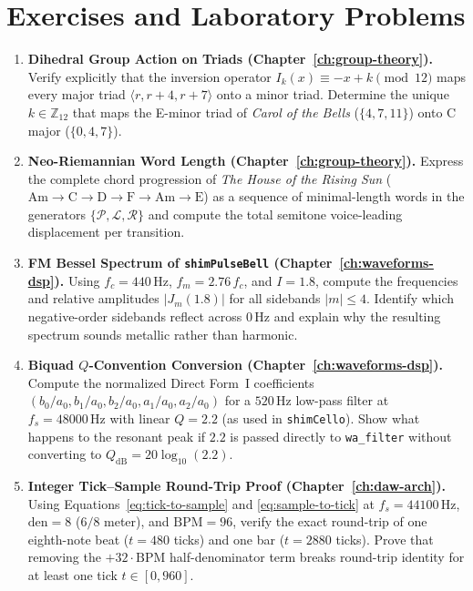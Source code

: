 \chapter{Exercises and Laboratory Problems}
\label{app:exercises}

\begin{enumerate}[leftmargin=1.5em]
  \item \textbf{Dihedral Group Action on Triads (Chapter~\ref{ch:group-theory}).}
  Verify explicitly that the inversion operator $I_k(x) \equiv -x + k \pmod{12}$ maps every major triad $\langle r, r+4, r+7\rangle$ onto a minor triad. Determine the unique $k \in \mathbb{Z}_{12}$ that maps the E-minor triad of \emph{Carol of the Bells} ($\{4, 7, 11\}$) onto C major ($\{0, 4, 7\}$).

  \item \textbf{Neo-Riemannian Word Length (Chapter~\ref{ch:group-theory}).}
  Express the complete chord progression of \emph{The House of the Rising Sun} ($\mathrm{Am} \to \mathrm{C} \to \mathrm{D} \to \mathrm{F} \to \mathrm{Am} \to \mathrm{E}$) as a sequence of minimal-length words in the generators $\{\mathcal{P}, \mathcal{L}, \mathcal{R}\}$ and compute the total semitone voice-leading displacement per transition.

  \item \textbf{FM Bessel Spectrum of \texttt{shimPulseBell} (Chapter~\ref{ch:waveforms-dsp}).}
  Using $f_c = 440\,\text{Hz}$, $f_m = 2.76\,f_c$, and $I = 1.8$, compute the frequencies and relative amplitudes $|J_m(1.8)|$ for all sidebands $|m| \le 4$. Identify which negative-order sidebands reflect across $0\,\text{Hz}$ and explain why the resulting spectrum sounds metallic rather than harmonic.

  \item \textbf{Biquad $Q$-Convention Conversion (Chapter~\ref{ch:waveforms-dsp}).}
  Compute the normalized Direct Form~I coefficients $(b_0/a_0, b_1/a_0, b_2/a_0, a_1/a_0, a_2/a_0)$ for a $520\,\text{Hz}$ low-pass filter at $f_s = 48000\,\text{Hz}$ with linear $Q = 2.2$ (as used in \texttt{shimCello}). Show what happens to the resonant peak if $2.2$ is passed directly to \texttt{wa\_filter} without converting to $Q_{\mathrm{dB}} = 20\log_{10}(2.2)$.

  \item \textbf{Integer Tick--Sample Round-Trip Proof (Chapter~\ref{ch:daw-arch}).}
  Using Equations~\eqref{eq:tick-to-sample} and \eqref{eq:sample-to-tick} at $f_s = 44100\,\text{Hz}$, $\mathrm{den} = 8$ ($6/8$ meter), and $\mathrm{BPM} = 96$, verify the exact round-trip of one eighth-note beat ($t = 480$ ticks) and one bar ($t = 2880$ ticks). Prove that removing the $+32\cdot\mathrm{BPM}$ half-denominator term breaks round-trip identity for at least one tick $t \in [0, 960]$.


\end{enumerate}
